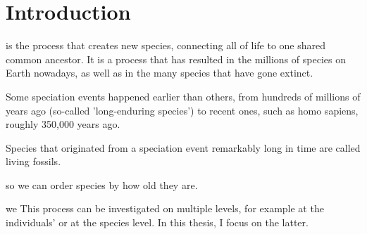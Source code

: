 \chapter{Introduction}
\label{chapter_introduction}




\newpage

\noindent 
{} is the process that creates new species,
connecting all of life to one shared common ancestor. It is a process
that has resulted in the millions of species on Earth nowadays, 
as well as in the many species that have gone extinct. 

Some speciation events happened earlier than others,
from hundreds of millions of years ago (so-called 'long-enduring species')
to recent ones, such as homo sapiens, roughly 350,000 years ago.


Species that
originated from a speciation event remarkably long in time are called
living fossils.

 so we can
order species by how old they are.
 
we 
This process
can be investigated on multiple levels, for example at the individuals'
or at the species level. In this thesis, I focus on the latter.


